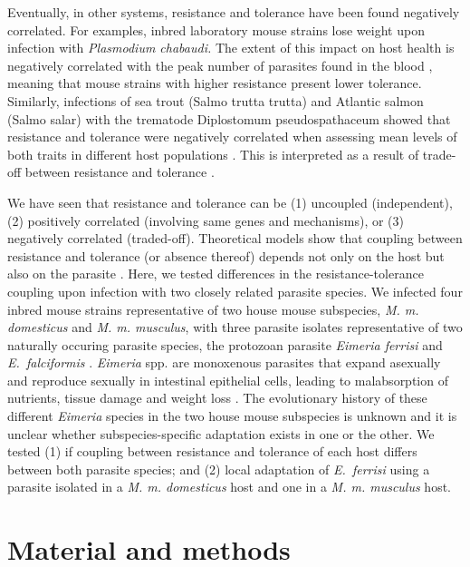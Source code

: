 Eventually, in other systems, resistance and tolerance have been found negatively correlated. For examples, inbred laboratory mouse strains lose weight upon infection with \textit{Plasmodium chabaudi.} The extent of this impact on host health is negatively correlated with the peak number of parasites found in the blood \citep{raaberg_disentangling_2007}, meaning that mouse strains with higher resistance present lower tolerance. Similarly, infections of sea trout (Salmo trutta trutta) and Atlantic salmon (Salmo salar) with the trematode Diplostomum pseudospathaceum showed that resistance and tolerance were negatively correlated when assessing mean levels of both traits in different host populations \citep{klemme_vertebrate_2016}. This is interpreted as a result of trade-off between resistance and tolerance \citep{sheldon_ecological_1996, restif_concurrent_2004, raaberg_decomposing_2009}.\par

We have seen that resistance and tolerance can be (1) uncoupled (independent), (2) positively correlated (involving same genes and mechanisms), or (3) negatively correlated (traded-off). Theoretical models show that coupling between resistance and tolerance (or absence thereof) depends not only on the host but also on the parasite \citep{Carval2010}. Here, we tested differences in the resistance-tolerance coupling upon infection with two closely related parasite species. We infected four inbred mouse strains representative of two house mouse subspecies, \textit{M. m. domesticus} and \textit{M. m. musculus}, with three parasite isolates representative of two naturally occuring parasite species, the protozoan parasite \textit{Eimeria ferrisi} and \textit{E.~falciformis }\citep{jarquin-diaz_detection_2019}. \textit{Eimeria }spp. are monoxenous parasites that expand asexually and reproduce sexually in intestinal epithelial cells, leading to malabsorption of nutrients, tissue damage and weight loss \citep{chapman_chapter_2013}. The evolutionary history of these different \textit{Eimeria} species in the two house mouse subspecies is unknown and it is unclear whether subspecies-specific adaptation exists in one or the other. We tested (1) if coupling between resistance and tolerance of each host differs between both parasite species; and (2) local adaptation of \textit{E.~ferrisi} using a parasite isolated in a \textit{M. m. domesticus} host and one in a \textit{M. m. musculus} host.\par

\section{Material and methods}

